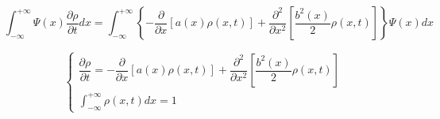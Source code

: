 $$
\int_{- \infty}^{+ \infty} \Psi(x) \dfrac{\partial \rho}{\partial t} dx = \int_{- \infty}^{+ \infty} \left\{ - \dfrac{\partial}{\partial x} \left[ a(x) \rho(x,t) \right] + \dfrac{\partial^2}{\partial x^2} \left[ \dfrac{b^2(x)}{2} \rho(x,t) \right] \right\} \Psi(x) dx
$$

$$
\begin{cases}
\dfrac{\partial \rho}{\partial t} = - \dfrac{\partial}{\partial x} \left[ a(x) \rho(x,t) \right] + \dfrac{\partial^2}{\partial x^2} \left[ \dfrac{b^2(x)}{2} \rho(x,t) \right]
\\
\int_{- \infty}^{+ \infty} \rho(x,t) dx = 1
\end{cases}
$$





